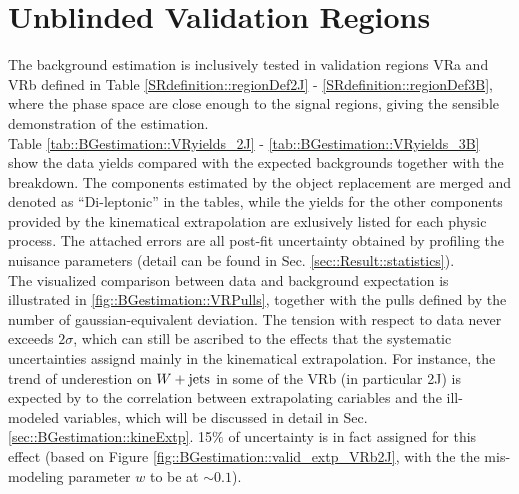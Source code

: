 %


\clearpage
\section{Unblinded Validation Regions} \label{sec::BGestimation::unblindedVRs}
The background estimation is inclusively tested in validation regions VRa and VRb defined in Table \ref{SRdefinition::regionDef2J} - \ref{SRdefinition::regionDef3B},
where the phase space are close enough to the signal regions, giving the sensible demonstration of the estimation. \\

Table \ref{tab::BGestimation::VRyields_2J} - \ref{tab::BGestimation::VRyields_3B} show the data yields compared with the expected backgrounds together with the breakdown. 
The components estimated by the object replacement are merged and denoted as ``Di-leptonic'' in the tables, 
while the yields for the other components provided by the kinematical extrapolation are exlusively listed for each physic process. 
The attached errors are all post-fit uncertainty obtained by profiling the nuisance parameters (detail can be found in Sec. \ref{sec::Result::statistics}). \\

The visualized comparison between data and background expectation is illustrated in \ref{fig::BGestimation::VRPulls}, together with the pulls defined by the number of gaussian-equivalent deviation. 
The tension with respect to data never exceeds $2\sigma$, which can still be ascribed to the effects that the systematic uncertainties assignd mainly in the kinematical extrapolation. For instance, the trend of underestion on $W+\mathrm{jets}$ in some of the VRb (in particular 2J) is expected by to the correlation between extrapolating cariables and the ill-modeled variables, which will be discussed in detail in Sec. \ref{sec::BGestimation::kineExtp}. 
15$\%$ of uncertainty is in fact assigned for this effect (based on Figure \ref{fig::BGestimation::valid_extp_VRb2J}, with the the mis-modeling parameter $w$ to be at $\sim0.1$). \\

